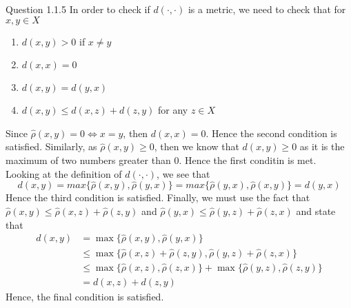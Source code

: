 \documentclass[12pt]{exam}
\begin{document}
\begin{questions}
\question Question 1.1.5\newline 
In order to check if $d(\cdot, \cdot)$ is a metric, we need to check that for $x,y \in X$ \begin{enumerate}
    \item $d(x,y) > 0$ if $x \neq y$ 
    \item $d(x,x) = 0$
    \item $d(x,y) = d(y,x)$
    \item $d(x,y) \leq d(x,z) + d(z,y)$ for any $z\in X$
\end{enumerate}
Since $\hat{\rho}(x,y) = 0 \iff x = y$, then $d(x,x) = 0$. Hence the second condition is satisfied. Similarly, as $\hat{\rho}(x,y) \geq 0 $, then we know that $d(x,y) \geq 0$ as it is the maximum of two numbers greater than $0$. Hence the first conditin is met. Looking at the definition of $d(\cdot, \cdot)$, we see that \[d(x,y) = max\{\hat{\rho}(x,y), \hat{\rho}(y,x)\} = max\{\hat{\rho}(y,x), \hat{\rho}(x,y)\} = d(y,x)\] Hence the third condition is satisfied. Finally, we must use the fact that $\hat{\rho}(x,y) \leq \hat{\rho}(x,z)+ \hat{\rho}(z,y)$ and $\hat{\rho}(y,x) \leq \hat{\rho}(y,z)+ \hat{\rho}(z,x)$ and state that 
\begin{align*}
    d(x,y) &= \max\{\hat{\rho}(x,y), \hat{\rho}(y,x)\} \\
    &\leq \max\{\hat{\rho}(x,z) + \hat{\rho}(z,y), \hat{\rho}(y,z) + \hat{\rho}(z,x)\} \\
    &\leq \max\{\hat{\rho}(x,z), \hat{\rho}(z,x)\} + \max\{\hat{\rho}(y,z), \hat{\rho}(z,y)\} \\
    &= d(x,z) + d(z,y)
    \end{align*}
    Hence, the final condition is satisfied. 


\end{questions}
\end{document}
